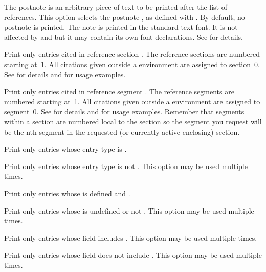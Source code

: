 \documentclass{ltxdockit}[2011/03/25]
\begin{document}
\begin{optionlist*}

The postnote is an arbitrary piece of text to be printed after the list of references. This option selects the postnote , as defined with . By default, no postnote is printed. The note is printed in the standard text font. It is not affected by  and  but it may contain its own font declarations. See  for details.


Print only entries cited in reference section . The reference sections are numbered starting at~1. All citations given outside a  environment are assigned to section~0. See  for details and  for usage examples.


Print only entries cited in reference segment . The reference segments are numbered starting at~1. All citations given outside a  environment are assigned to segment~0. See  for details and  for usage examples. Remember that segments within a section are numbered local to the section so the segment you request will be the nth segment in the requested (or currently active enclosing) section.


Print only entries whose entry type is .


Print only entries whose entry type is not . This option may be used multiple times.


Print only entries whose  is defined and .


Print only entries whose  is undefined or not . This option may be used multiple times.


Print only entries whose  field includes . This option may be used multiple times.


Print only entries whose  field does not include . This option may be used multiple times.


\end{optionlist*}
\end{document}
